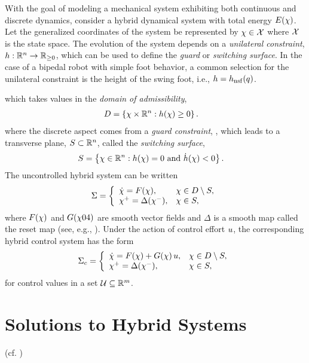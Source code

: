 With the goal of modeling a mechanical system exhibiting both continuous and discrete dynamics, consider a hybrid dynamical system with total energy $E(\chi)$.
%
Let the generalized coordinates of the system be represented by $\chi \in \mathcal{X}$ where $\mathcal{X}$ is the state space.
%
The evolution of the system depends on a {\em unilateral constraint}, $h : \mathbb{R}^{n} \to \mathbb{R}_{\geq 0}$, which can be used to define the {\em guard} or {\em switching surface}.
%
In the case of a bipedal robot with simple foot behavior, a common selection for the unilateral constraint is the height of the swing foot, i.e., $h = h_{\mathrm{nsf}}(q)$.


which takes values in the {\em domain of admissibility},
%
\begin{align}
  \label{eq:domain}
  D &= \left\{ \chi \times \mathbb{R}^{n} : h(\chi) \geq 0 \right\}.
\end{align}
%
where the discrete aspect comes from a {\em guard constraint}, , which leads to a transverse plane, $S \subset \mathbb{R}^{n}$, called the {\em switching surface},
%
\begin{align}
  \label{eq:guard}
  S &= \left\{ \chi \in \mathbb{R}^{n} : h(\chi) = 0 \mbox{ and } {\dot h}(\chi) < 0 \right\}.
\end{align}
%
The uncontrolled hybrid system can be written
%
\begin{align}
  \Sigma = \left\{
  \begin{array}{l l}
    {\dot {\chi}} = F(\chi), & \chi \in D \setminus S,\\
    \chi^{+} = \Delta(\chi^{-}), & \chi \in S,
  \end{array}\right.
  \label{eq:hsys}
\end{align}
%
where $F(\chi)$ and $G(\chi04)$ are smooth vector fields and $\Delta$ is a smooth map called the reset map (see, e.g., \cite{MoGr05}).
%
Under the action of control effort $u$, the corresponding hybrid control system has the form
%
\begin{align}
  \Sigma_{c} = \left\{
  \begin{array}{l l}
    {\dot {\chi}} = F(\chi) + G(\chi) \, u, & \chi \in D \setminus S,\\
    \chi^{+} = \Delta(\chi^{-}), & \chi \in S,
  \end{array}\right.
  \label{eq:hcsys}
\end{align}
%
for control values in a set $\mathcal{U} \subseteq \mathbb{R}^{m}$.
%


\section{Solutions to Hybrid Systems}
(cf. \cite{YeMiHo98})

